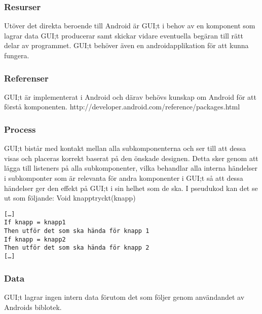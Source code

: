 \subsubsection{Resurser}
Utöver det direkta beroende till Android är GUI;t i behov av en komponent som lagrar data GUI;t producerar samt skickar vidare eventuella begäran till rätt delar av programmet. GUI;t behöver även en androidapplikation för att kunna fungera.

\subsubsection{Referenser}
GUI;t är implementerat i Android och därav behövs kunskap om Android för att förstå komponenten.
http://developer.android.com/reference/packages.html

\subsubsection{Process}
GUI;t bistår med kontakt mellan alla subkomponenterna och ser till att dessa visas och placeras korrekt baserat på den önskade designen. Detta sker genom att lägga till listeners på alla subkomponenter, vilka behandlar alla interna händelser i subkomponter som är relevanta för andra komponenter i GUI;t  så att dessa händelser ger den effekt på GUI;t i sin helhet som de ska. I pseudukod kan det se ut som följande:
Void knapptryckt(knapp)
\begin{verbatim}
[…]
If knapp = knapp1
Then utför det som ska hända för knapp 1
If knapp = knapp2
Then utför det som ska hända för knapp 2
[…]
\end{verbatim}

\subsubsection{Data}
GUI;t lagrar ingen intern data förutom det som följer genom användandet av Androids biblotek.
